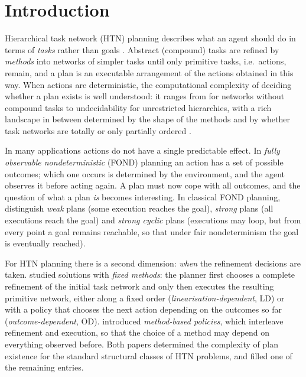 \section{Introduction}\label{sec:intro}

Hierarchical task network (HTN) planning describes what an agent should do in terms of
\emph{tasks} rather than goals \parencite{erol:et:al:amai-96,ghallab:et:al:04,bercher:et:al:ijcai-19}.
Abstract (compound) tasks are refined by \emph{methods} into networks of simpler tasks until
only primitive tasks, i.e.\ actions, remain, and a plan is an executable arrangement of the
actions obtained in this way. When actions are deterministic, the computational complexity of
deciding whether a plan exists is well understood: it ranges from \NP{} for networks without
compound tasks to undecidability for unrestricted hierarchies, with a rich landscape in between
determined by the shape of the methods and by whether task networks are totally or only
partially ordered \parencite{erol:et:al:amai-96,geier:bercher:ijcai-11,alford:et:al:icaps-15}.

In many applications actions do not have a single predictable effect. In \emph{fully observable
nondeterministic} (FOND) planning an action has a set of possible outcomes; which one occurs is
determined by the environment, and the agent observes it before acting again. A plan must now
cope with all outcomes, and the question of what a plan \emph{is} becomes interesting. In
classical FOND planning, \textcite{cimatti:et:al:aij-03} distinguish \emph{weak} plans (some
execution reaches the goal), \emph{strong} plans (all executions reach the goal) and
\emph{strong cyclic} plans (executions may loop, but from every point a goal remains
reachable, so that under fair nondeterminism the goal is eventually reached).

For HTN planning there is a second dimension: \emph{when} the refinement decisions are taken.
\CBa{} studied solutions with \emph{fixed methods}: the planner first chooses a complete
refinement of the initial task network and only then executes the resulting primitive network,
either along a fixed order (\emph{linearisation-dependent}, LD) or with a policy that chooses
the next action depending on the outcomes so far (\emph{outcome-dependent}, OD). \CBb{}
introduced \emph{method-based policies}, which interleave refinement and execution, so that the
choice of a method may depend on everything observed before. Both papers determined the
complexity of plan existence for the standard structural classes of HTN problems, and
\DB{} filled one of the remaining entries.

